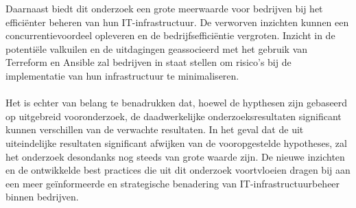 Daarnaast biedt dit onderzoek een grote meerwaarde voor bedrijven bij het efficiënter beheren van hun IT-infrastructuur. De verworven inzichten kunnen een concurrentievoordeel opleveren en de bedrijfsefficiëntie vergroten. Inzicht in de potentiële valkuilen en de uitdagingen geassocieerd met het gebruik van Terreform en Ansible zal bedrijven in staat stellen om risico’s bij de implementatie van hun infrastructuur te minimaliseren. \\\\

Het is echter van belang te benadrukken dat, hoewel de hypthesen zijn gebaseerd op uitgebreid vooronderzoek, de daadwerkelijke onderzoeksresultaten significant kunnen verschillen van de verwachte resultaten. In het geval dat de uit uiteindelijke resultaten significant afwijken van de vooropgestelde hypotheses, zal het onderzoek desondanks nog steeds van grote waarde zijn. De nieuwe inzichten en de ontwikkelde best practices die uit dit onderzoek voortvloeien dragen bij aan een meer geïnformeerde en strategische benadering van IT-infrastructuurbeheer binnen bedrijven. \\\\

